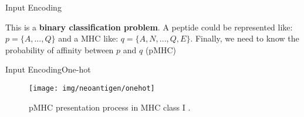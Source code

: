\documentclass[10pt]{beamer}
\newcommand{\1}{
	\setbeamertemplate{background}{
		\texttt{[image: img/1]}
		\tikz[overlay] \fill[fill opacity=0.75,fill=white] (0,0) rectangle (-\paperwidth,\paperheight);
	}
}
\begin{document}
\begin{frame}{Input Encoding}{}
	\begin{block}{}
		This is a \textbf{binary classification problem}. A peptide could be represented like: $p = \{ A, ... , Q \}$ and a MHC like: $q = \{ A, N, ... ,Q, E \}$. Finally, we need to know the probability of affinity between $p$ and $q$ (pMHC)
	\end{block}

\end{frame}

\begin{frame}{Input Encoding}{One-hot}	
	
	\begin{figure}[H]
		\centering
		\texttt{[image: img/neoantigen/onehot]}
		\caption{pMHC presentation process in MHC class I \cite{zhang2019application}.}		
	\end{figure}
\end{frame}
\end{document}
